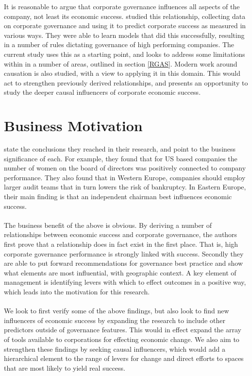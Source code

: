 {It is reasonable to argue that corporate governance influences all aspects of the company, not least its economic success. \cite{moldovan2015learning} studied this relationship, collecting data on corporate governance and using it to predict corporate success as measured in various ways. They were able to learn models that did this successfully, resulting in a number of rules dictating governance of high performing companies. The current study uses this as a starting point, and looks to address some limitations within in a number of areas, outlined in section \ref{RGAS}. Modern work around causation is also studied, with a view to applying it in this domain. This would act to strengthen previously derived relationships, and presents an opportunity to study the deeper causal influencers of corporate economic success.}
\section{Business Motivation}
{\cite{moldovan2015learning} state the conclusions they reached in their research, and point to the business significance of each. For example, they found that for US based companies the number of women on the board of directors was positively connected to company performance. They also found that in Western Europe, companies should employ larger audit teams that in turn lowers the risk of bankruptcy. In Eastern Europe, their main finding is that an independent chairman best influences economic success.\\\\ 
The business benefit of the above is obvious. By deriving a number of relationships between economic success and corporate governance, the authors first prove that a relationship does in fact exist in the first place. That is, high corporate governance performance is strongly linked with success. Secondly they are able to put forward recommendations for governance best practice and show what elements are most influential, with geographic context. A key element of management is identifying levers with which to effect outcomes in a positive way, which leads into the motivation for this research.\\\\
We look to first verify some of the above findings, but also look to find new influencers of economic success by expanding the research to include other predictors outside of governance features. This would in effect expand the array of tools available to corporations for effecting economic change. We also aim to strengthen these findings by seeking causal influencers, which would add a hierarchical element to the range of levers for change and direct efforts to spaces that are most likely to yield real success. }

